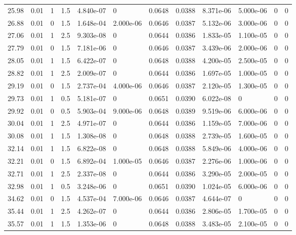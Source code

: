 \documentclass[preview]{standalone}
\begin{document}
{{{\begin{tabular}{L{1.2cm}C{1.2cm} C{0.3cm}C{0.5cm} C{1.4cm}C{1.4cm} C{1.4cm}C{1.4cm} C{1.6cm}C{1.6cm} C{1.6cm}C{1.6cm}}
  25.98  &  0.01  & 1     & 1.5 &  4.840e-07  & 0  &  0.0648&   0.0388& 8.371e-06 & 5.000e-06   &  0 & 0  \\ 
  26.88  &  0.01  & 0     & 1.5 &  1.648e-04  & 2.000e-06  &  0.0646&   0.0387& 5.132e-06 & 3.000e-06   &  0 & 0  \\ 
  27.06  &  0.01  & 1     & 2.5 &  9.303e-08  & 0  &  0.0644&   0.0386& 1.833e-05 & 1.100e-05   &  0 & 0  \\ 
  27.79  &  0.01  & 0     & 1.5 &  7.181e-06  & 0  &  0.0646&   0.0387& 3.439e-06 & 2.000e-06   &  0 & 0  \\ 
  28.05  &  0.01  & 1     & 1.5 &  6.422e-07  & 0  &  0.0648&   0.0388& 4.200e-05 & 2.500e-05   &  0 & 0  \\ 
  28.82  &  0.01  & 1     & 2.5 &  2.009e-07  & 0  &  0.0644&   0.0386& 1.697e-05 & 1.000e-05   &  0 & 0  \\ 
  29.19  &  0.01  & 0     & 1.5 &  2.737e-04  & 4.000e-06  &  0.0646&   0.0387& 2.120e-05 & 1.300e-05   &  0 & 0  \\ 
  29.73  &  0.01  & 1     & 0.5 &  5.181e-07  & 0  &  0.0651&   0.0390& 6.022e-08 & 0   &  0 & 0  \\ 
  29.92  &  0.01  & 0     & 0.5 &  5.903e-04  & 9.000e-06  &  0.0648&   0.0389& 9.519e-06 & 6.000e-06   &  0 & 0  \\ 
  30.04  &  0.01  & 1     & 2.5 &  4.971e-07  & 0  &  0.0644&   0.0386& 1.159e-05 & 7.000e-06   &  0 & 0  \\ 
  30.08  &  0.01  & 1     & 1.5 &  1.308e-08  & 0  &  0.0648&   0.0388& 2.739e-05 & 1.600e-05   &  0 & 0  \\ 
  32.14  &  0.01  & 1     & 1.5 &  6.822e-08  & 0  &  0.0648&   0.0388& 5.849e-06 & 4.000e-06   &  0 & 0  \\ 
  32.21  &  0.01  & 0     & 1.5 &  6.892e-04  & 1.000e-05  &  0.0646&   0.0387& 2.276e-06 & 1.000e-06   &  0 & 0  \\ 
  32.71  &  0.01  & 1     & 2.5 &  2.337e-08  & 0  &  0.0644&   0.0386& 3.290e-05 & 2.000e-05   &  0 & 0  \\ 
  32.98  &  0.01  & 1     & 0.5 &  3.248e-06  & 0  &  0.0651&   0.0390& 1.024e-05 & 6.000e-06   &  0 & 0  \\ 
  34.62  &  0.01  & 0     & 1.5 &  4.537e-04  & 7.000e-06  &  0.0646&   0.0387& 4.644e-07 & 0   &  0 & 0  \\ 
  35.44  &  0.01  & 1     & 2.5 &  4.262e-07  & 0  &  0.0644&   0.0386& 2.806e-05 & 1.700e-05   &  0 & 0  \\ 
  35.57  &  0.01  & 1     & 1.5 &  1.353e-06  & 0  &  0.0648&   0.0388& 3.483e-05 & 2.100e-05   &  0 & 0  \\ 

\end{tabular}}}}
\end{document}
